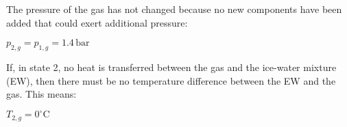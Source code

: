 The pressure of the gas has not changed because no new components have been added that could exert additional pressure:  

\( p_{2,g} = p_{1,g} = 1.4 \, \text{bar} \)  

If, in state 2, no heat is transferred between the gas and the ice-water mixture (EW), then there must be no temperature difference between the EW and the gas. This means:  

\( T_{2,g} = 0^\circ \text{C} \)
